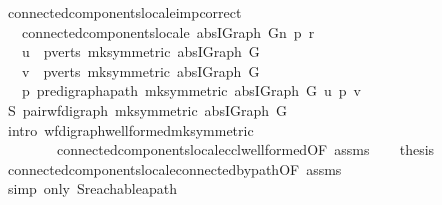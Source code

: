\begin{isabellebody}
\endisatagproof
{\isafoldproof}%
%
\isadelimproof
\isanewline
%
\endisadelimproof
\isanewline
{}\isamarkupfalse%
\ connected{\isacharunderscore}components{\isacharunderscore}locale{\isacharunderscore}imp{\isacharunderscore}correct{\isacharcolon}\isanewline
\ \ \ {\isachardoublequoteopen}connected{\isacharunderscore}components{\isacharunderscore}locale\ {\isacharparenleft}abs{\isacharunderscore}IGraph\ G{\isacharparenright}n\ p\ r{\isachardoublequoteclose}\isanewline
\ \ \ {\isachardoublequoteopen}u\ {\isasymin}\ pverts\ {\isacharparenleft}mk{\isacharunderscore}symmetric\ {\isacharparenleft}abs{\isacharunderscore}IGraph\ G{\isacharparenright}{\isacharparenright}{\isachardoublequoteclose}\isanewline
\ \ \ {\isachardoublequoteopen}v\ {\isasymin}\ pverts\ {\isacharparenleft}mk{\isacharunderscore}symmetric\ {\isacharparenleft}abs{\isacharunderscore}IGraph\ G{\isacharparenright}{\isacharparenright}{\isachardoublequoteclose}\isanewline
\ \ \ {\isachardoublequoteopen}{\isasymexists}p{\isachardot}\ pre{\isacharunderscore}digraph{\isachardot}apath\ {\isacharparenleft}mk{\isacharunderscore}symmetric\ {\isacharparenleft}abs{\isacharunderscore}IGraph\ G{\isacharparenright}{\isacharparenright}\ u\ p\ v{\isachardoublequoteclose}\isanewline
%
\isadelimproof
%
\endisadelimproof
%
\isatagproof
{}\isamarkupfalse%
\ {\isacharminus}\isanewline
\ \ \isamarkupfalse%
\ S{\isacharcolon}\ pair{\isacharunderscore}wf{\isacharunderscore}digraph\ {\isachardoublequoteopen}mk{\isacharunderscore}symmetric\ {\isacharparenleft}abs{\isacharunderscore}IGraph\ G{\isacharparenright}{\isachardoublequoteclose}\isanewline
\ \ \ \ \isamarkupfalse%
\ {\isacharparenleft}intro\ wf{\isacharunderscore}digraph{\isachardot}wellformed{\isacharunderscore}mk{\isacharunderscore}symmetric\isanewline
\ \ \ \ \ \ \ \ connected{\isacharunderscore}components{\isacharunderscore}locale{\isachardot}ccl{\isacharunderscore}wellformed{\isacharbrackleft}OF\ assms{\isacharparenleft}{}{\isacharparenright}{\isacharbrackright}{\isacharparenright}\isanewline
\ \ \isamarkupfalse%
\ {\isacharquery}thesis\isanewline
\ \ \ \ \isamarkupfalse%
\ connected{\isacharunderscore}components{\isacharunderscore}locale{\isachardot}connected{\isacharunderscore}by{\isacharunderscore}path{\isacharbrackleft}OF\ assms{\isacharbrackright}\isanewline
\ \ \ \ \isamarkupfalse%
\ {\isacharparenleft}simp\ only{\isacharcolon}\ S{\isachardot}reachable{\isacharunderscore}apath{\isacharparenright}\isanewline

\end{isabellebody}
